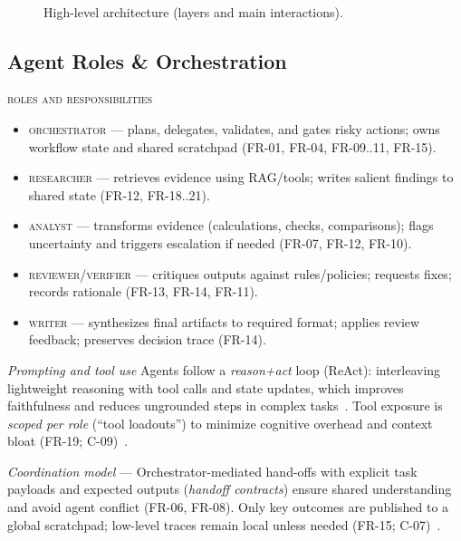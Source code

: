 \begin{figure}[h!]
  \centering
  \caption{High-level architecture (layers and main interactions).}~\label{fig:arch-overview}
\end{figure}

\subsection{Agent Roles \& Orchestration}\label{sec:roles-orchestration}

\textsc{roles and responsibilities}
\begin{itemize}
  \item \textsc{orchestrator} --- plans, delegates, validates, and gates risky actions; owns workflow state and shared scratchpad (FR-01, FR-04, FR-09..11, FR-15).
  \item \textsc{researcher} --- retrieves evidence using RAG/tools; writes salient findings to shared state (FR-12, FR-18..21).
  \item \textsc{analyst} --- transforms evidence (calculations, checks, comparisons); flags uncertainty and triggers escalation if needed (FR-07, FR-12, FR-10).
  \item \textsc{reviewer/verifier} --- critiques outputs against rules/policies; requests fixes; records rationale (FR-13, FR-14, FR-11).
  \item \textsc{writer} --- synthesizes final artifacts to required format; applies review feedback; preserves decision trace (FR-14).
\end{itemize}

\noindent \textit{Prompting and tool use} Agents follow a \emph{reason+act} loop (ReAct): interleaving lightweight reasoning with tool calls and state updates, which improves faithfulness and reduces ungrounded steps in complex tasks~\parencite{yaoReAct2023}. Tool exposure is \emph{scoped per role} (``tool loadouts'') to minimize cognitive overhead and context bloat (\textsc{FR-19; C-09})~\parencite{breunig_context_fail,breunig_fix_context}.

\noindent \textit{Coordination model} --- Orchestrator-mediated hand-offs with explicit task payloads and expected outputs (\emph{handoff contracts}) ensure shared understanding and avoid agent conflict (FR-06, FR-08). Only key outcomes are published to a global scratchpad; low-level traces remain local unless needed (\textsc{FR-15; C-07})~\parencite{cognition_dont_build,langchain_multi_agents}.


